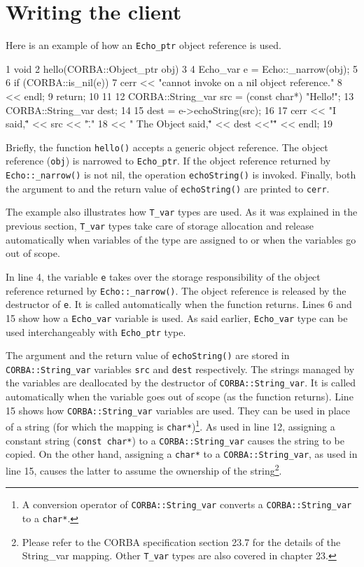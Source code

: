 \documentclass[11pt,twoside,a4paper]{book}
\newcommand{\type}[1]{\texttt{#1}}
\newcommand{\code}[1]{\texttt{#1}}
\newcommand{\op}[1]{\texttt{#1()}}
\newcommand{\dsc}{\discretionary{}{}{}}
\begin{document}
\section{Writing the client}

Here is an example of how an \type{Echo\_ptr} object reference is
used.

\lstset{labelstep=1,gobble=4}
\begin{cxxlisting}
 1  void
 2  hello(CORBA::Object_ptr obj)
 3  {
 4    Echo_var e = Echo::_narrow(obj);
 5
 6    if (CORBA::is_nil(e)) {
 7      cerr << "cannot invoke on a nil object reference.\n"
 8           << endl;
 9      return;
10    }
11
12    CORBA::String_var src = (const char*) "Hello!";
13    CORBA::String_var dest;
14
15    dest = e->echoString(src);
16
17    cerr << "I said,\"" << src << "\"."
18         << " The Object said,\"" << dest <<"\"" << endl;
19  }
\end{cxxlisting}
\lstset{labelstep=0,gobble=0}

Briefly, the function \op{hello} accepts a generic object reference.
The object reference (\code{obj}) is narrowed to \type{Echo\_ptr}. If
the object reference returned by \op{Echo::\_narrow} is not nil, the
operation \op{echoString} is invoked. Finally, both the argument to
and the return value of \op{echoString} are printed to \code{cerr}.

The example also illustrates how \type{T\_var} types are used. As it
was explained in the previous section, \type{T\_var} types take care
of storage allocation and release automatically when variables of the
type are assigned to or when the variables go out of scope.

In line 4, the variable \code{e} takes over the storage responsibility
of the object reference returned by \op{Echo::\_narrow}. The object
reference is released by the destructor of \code{e}. It is called
automatically when the function returns. Lines 6 and 15 show how a
\type{Echo\_var} variable is used. As said earlier, \type{Echo\_var}
type can be used interchangeably with \type{Echo\_ptr} type.

The argument and the return value of \op{echoString} are stored in
\type{CORBA::\dsc{}String\_var} variables \code{src} and \code{dest}
respectively. The strings managed by the variables are deallocated by
the destructor of \type{CORBA::String\_var}. It is called
automatically when the variable goes out of scope (as the function
returns). Line 15 shows how \type{CORBA::String\_var} variables are
used. They can be used in place of a string (for which the mapping is
\type{char*})\footnote{A conversion operator of
\type{CORBA::String\_var} converts a \type{CORBA::\dsc{}String\_var}
to a \type{char*}.}. As used in line 12, assigning a constant string
(\type{const char*}) to a \type{CORBA::String\_var} causes the string
to be copied. On the other hand, assigning a \type{char*} to a
\type{CORBA::String\_var}, as used in line 15, causes the latter to
assume the ownership of the string\footnote{Please refer to the CORBA
specification section 23.7 for the details of the String\_var
mapping. Other \type{T\_var} types are also covered in chapter 23.}.
\end{document}
